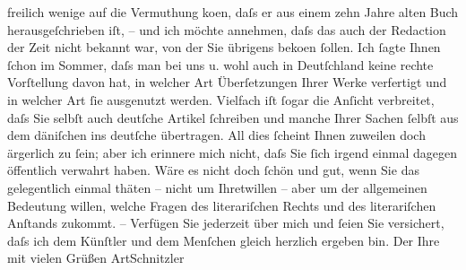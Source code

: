 \begin{ledgroupsized}[t]{13cm}
                    freilich wenige auf die Vermuthung ko{\geminationm}en, daſs er
                    aus einem {\pb}zehn Jahre alten Buch
                    herausgeſchrieben iſt, – und ich möchte annehmen, daſs das auch der Redaction
                    der Zeit nicht bekannt war, von der Sie
                    übrigens \label{K_L00602_1v}\label{K_L00602_1h} beko{\geminationm}en ſollen. Ich ſagte Ihnen ſchon im Sommer, daſs
                    man bei uns u. wohl auch in Deutſchland keine
                    rechte Vorſtellung davon hat, in welcher Art Überſetzungen Ihrer Werke
                    verfertigt und in welcher Art ſie ausgenutzt werden. Vielfach iſt ſogar die
                    Anſicht verbreitet, daſs Sie selbſt auch deutſche Artikel ſchreiben und manche
                    Ihrer Sachen ſelbſt aus dem däniſchen ins
                    deutſche übertragen.\pend
           \pstart
           {\pb}All dies ſcheint Ihnen zuweilen doch
                    ärgerlich zu ſein; aber ich erinnere mich nicht, daſs Sie ſich irgend einmal
                    dagegen öffentlich verwahrt haben.\pend
           \pstart
           Wäre es nicht doch ſchön und gut, wenn Sie das gelegentlich einmal thäten – nicht
                    um Ihretwillen – aber um der allgemeinen Bedeutung willen, welche Fragen des
                    literariſchen Rechts und des literariſchen Anſtands zukommt. –\pend
           \pstart
           Verfügen Sie jederzeit über mich und ſeien Sie versichert, daſs ich dem Künſtler
                    und dem Menſchen gleich herzlich ergeben bin.\pend
           \pstart Der Ihre mit vielen Grüßen \spacefill\mbox{ArtSchnitzler}\pend{}\endnumbering{}\end{ledgroupsized}  \newcommand{\dateiname}{L00602}\newcommand{\titel}{Arthur Schnitzler an Georg Brandes, 8. 10. 1896}\newcommand{\editorInnen}{Martin Anton Müller und Gerd-Hermann Susen}
      